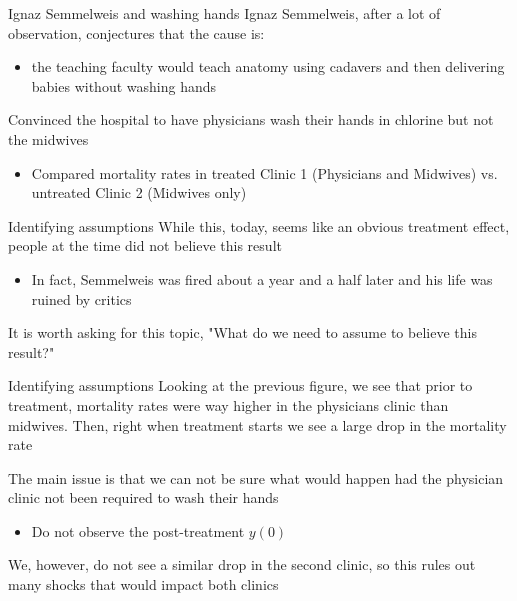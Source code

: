 \documentclass[aspectratio=169,t,11pt,table]{beamer}
\begin{document}
\begin{frame}{Ignaz Semmelweis and washing hands}
  Ignaz Semmelweis, after a lot of observation, conjectures that the cause is:
  \begin{itemize}
    \item the teaching faculty would teach anatomy using cadavers and then delivering babies without washing hands
  \end{itemize}

  \bigskip
  Convinced the hospital to have physicians wash their hands in chlorine but not the midwives
  \begin{itemize}
    \item Compared mortality rates in treated Clinic 1 (Physicians and Midwives) vs. untreated Clinic 2 (Midwives only)
  \end{itemize} 
\end{frame}


\begin{frame}{Identifying assumptions}
  While this, today, seems like an obvious treatment effect, people at the time did not believe this result
  \begin{itemize}
    \item In fact, Semmelweis was fired about a year and a half later and his life was ruined by critics
  \end{itemize}

  \bigskip
  It is worth asking for this topic, "What do we need to assume to believe this result?"
\end{frame}

\begin{frame}{Identifying assumptions}
  Looking at the previous figure, we see that prior to treatment, mortality rates were way higher in the physicians clinic than midwives.
  Then, right when treatment starts we see a large drop in the mortality rate
  
  \bigskip
  The main issue is that we can not be sure what would happen had the physician clinic not been required to wash their hands
  \begin{itemize}
    \item Do not observe the post-treatment $y(0)$
  \end{itemize}

  \pause
  \bigskip
  We, however, do not see a similar drop in the second clinic, so this rules out many shocks that would impact both clinics
\end{frame}
\end{document}
